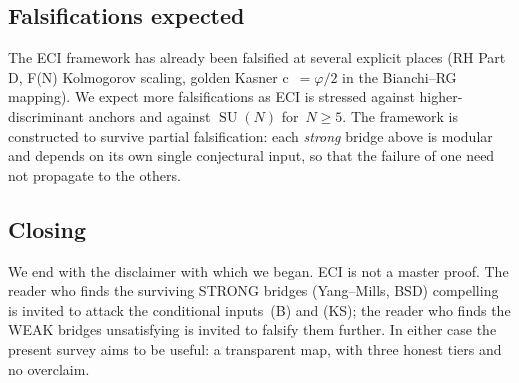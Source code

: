 \documentclass[11pt,a4paper]{article}
\theoremstyle{definition}
\DeclareMathOperator{\SU}{SU}
\begin{document}
\subsection{Falsifications expected}
The ECI framework has already been falsified at several explicit
places (RH Part D, F(N) Kolmogorov scaling, golden Kasner
\textsf{c}~$=\varphi/2$ in the Bianchi--RG mapping). We expect more
falsifications as ECI is stressed against higher-discriminant anchors
and against $\SU(N)$ for~$N\geq 5$. The framework is constructed to
survive partial falsification: each \emph{strong} bridge above is
modular and depends on its own single conjectural input, so that the
failure of one need not propagate to the others.

\subsection{Closing}
We end with the disclaimer with which we began. ECI is not a master
proof. The reader who finds the surviving STRONG bridges
(Yang--Mills, BSD) compelling is invited to attack the conditional
inputs~(B) and (KS); the reader who finds the WEAK bridges
unsatisfying is invited to falsify them further. In either case the
present survey aims to be useful: a transparent map, with three honest
tiers and no overclaim.
\end{document}
